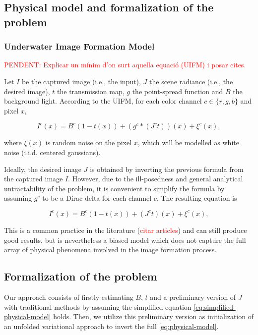\documentclass[twocolumn,twoside,a4paper,10pt]{IEEEtran}
\newcommand{\Frank}[1]{\textcolor{red}{#1}}
\begin{document}
\subsection{Physical model and formalization of the problem} \label{subsec:physical-model}
\subsubsection{Underwater Image Formation Model}
\Frank{PENDENT: Explicar un mínim d'on surt aquella equació (UIFM) i posar cites.}

Let \(I\) be the captured image (i.e., the input), \(J\) the scene radiance (i.e., the desired image), \(t\) the transmission map, \(g\) the point-spread function and \(B\) the background light. According to the UIFM, for each color channel \(c\in\{r, g, b\}\) and pixel \(x\),

\begin{equation}\label{eq:physical-model}
  I^c(x) = B^c\left(1 - t(x)\right) + \left(g^c\ast\left(J^c t\right)\right) (x) + \xi^c(x),
\end{equation}

where \(\xi(x)\) is random noise on the pixel \(x\), which will be modelled as white noise (i.i.d. centered gaussians).

Ideally, the desired image \(J\) is obtained by inverting the previous formula from the captured image \(I\). However, due to the ill-posedness and general analytical untractability of the problem, it is convenient to simplify the formula by assuming \(g^c\) to be a Dirac delta for each channel \(c\). The resulting equation is

\begin{equation}\label{eq:simplified-physical-model}
  I^c(x) = B^c\left(1 - t(x)\right) + \left(J^c t\right) (x) + \xi^c(x),
\end{equation}

This is a common practice in the literature (\Frank{citar articles}) and can still produce good results, but is nevertheless a biased model which does not capture the full array of physical phenomena involved in the image formation process.

\subsection{Formalization of the problem}
Our approach consists of firstly estimating \(B\), \(t\) and a preliminary version of \(J\) with traditional methods by assuming the simplified equation \cref{eq:simplified-physical-model} holds. Then, we utilize this preliminary version as initialization of an unfolded variational approach to invert the full \cref{eq:physical-model}.
\end{document}
